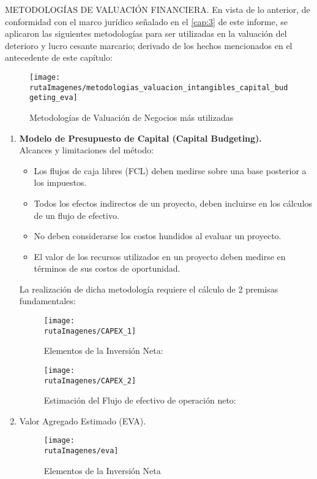 
\textcolor{secundario}{METODOLOG\'IAS DE VALUACI\'ON FINANCIERA}. En vista de lo anterior, de conformidad con el marco jurídico señalado en el \autoref{cap:3} de este informe, se aplicaron las siguientes metodologías para ser utilizadas en la valuación del deterioro y lucro cesante marcario; derivado de los hechos mencionados en el antecedente de este capítulo:\\

\begin{figure}[H]
\centering
\caption{Metodolog\'ias de Valuaci\'on de Negocios m\'as utilizadas\label{fig:metodologias}}
\texttt{[image: \\rutaImagenes/metodologias\_valuacion\_intangibles\_capital\_budgeting\_eva]}\\

\end{figure}

\begin{enumerate}[1)]

\item \textbf{{\textprincipal}{Modelo de Presupuesto de Capital (Capital Budgeting).}}\\

Alcances y limitaciones del método:
\begin{itemize}

\item Los flujos de caja libres (FCL) deben medirse sobre una base posterior a los impuestos.
\item Todos los efectos indirectos de un proyecto, deben incluirse en los cálculos de un flujo de efectivo.
\item No deben considerarse los costos hundidos al evaluar un proyecto.
\item El valor de los recursos utilizados en un proyecto deben medirse en términos de sus costos de oportunidad.

\end{itemize}

La realización de dicha metodología requiere el cálculo de 2 premisas fundamentales:

\begin{figure}[H]
\centering
\caption{Elementos de la Inversión Neta:}
\texttt{[image: \\rutaImagenes/CAPEX\_1]}\\
\end{figure}

\begin{figure}[H]
\centering
\caption{Estimación del Flujo de efectivo de operación neto:}
\texttt{[image: \\rutaImagenes/CAPEX\_2]}\\
\end{figure}

\item Valor Agregado Estimado (EVA).

\begin{figure}[H]
\centering
\caption{Elementos de la Inversión Neta}
\texttt{[image: \\rutaImagenes/eva]}\\
\end{figure}


\end{enumerate}